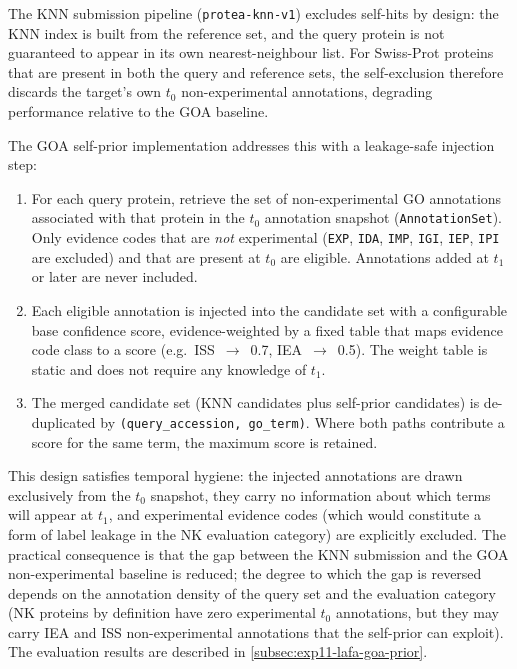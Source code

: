 The KNN submission pipeline (\texttt{protea-knn-v1}) excludes self-hits by
design: the KNN index is built from the reference set, and the query protein
is not guaranteed to appear in its own nearest-neighbour list. For Swiss-Prot
proteins that are present in both the query and reference sets, the
self-exclusion therefore discards the target's own $t_0$ non-experimental
annotations, degrading performance relative to the GOA baseline.

The GOA self-prior implementation addresses this with a leakage-safe
injection step:

\begin{enumerate}
  \item For each query protein, retrieve the set of non-experimental GO
    annotations associated with that protein in the $t_0$ annotation snapshot
    (\texttt{AnnotationSet}). Only evidence codes that are
    \emph{not} experimental (\texttt{EXP}, \texttt{IDA}, \texttt{IMP},
    \texttt{IGI}, \texttt{IEP}, \texttt{IPI} are excluded) and that are
    present at $t_0$ are eligible. Annotations added at $t_1$ or later are
    never included.
  \item Each eligible annotation is injected into the candidate set with a
    configurable base confidence score, evidence-weighted by a fixed table
    that maps evidence code class to a score (e.g.\ ISS~$\to$~0.7,
    IEA~$\to$~0.5). The weight table is static and does not require any
    knowledge of $t_1$.
  \item The merged candidate set (KNN candidates plus self-prior candidates)
    is de-duplicated by \texttt{(query\_accession, go\_term)}. Where both
    paths contribute a score for the same term, the maximum score is retained.
\end{enumerate}

This design satisfies temporal hygiene: the injected annotations are drawn
exclusively from the $t_0$ snapshot, they carry no information about which
terms will appear at $t_1$, and experimental evidence codes (which would
constitute a form of label leakage in the NK evaluation category) are
explicitly excluded. The practical consequence is that the gap between the KNN
submission and the GOA non-experimental baseline is reduced; the degree to
which the gap is reversed depends on the annotation density of the query set
and the evaluation category (NK proteins by definition have zero experimental
$t_0$ annotations, but they may carry IEA and ISS non-experimental annotations
that the self-prior can exploit). The evaluation results are described in
\cref{subsec:exp11-lafa-goa-prior}.

